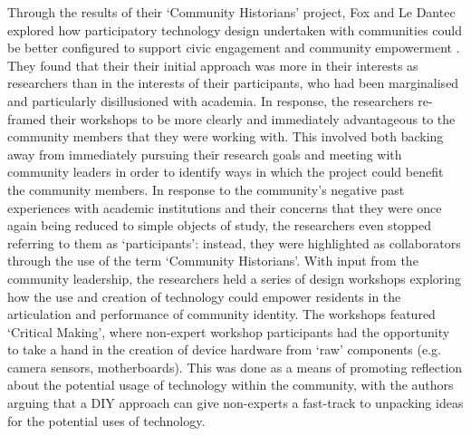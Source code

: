 Through the results of their `Community Historians' project, Fox and Le Dantec explored how participatory technology design undertaken with communities could be better configured to support civic engagement and community empowerment \citep{Fox2014}. They found that their their initial approach was more in their interests as researchers than in the interests of their participants, who had been marginalised and particularly disillusioned with academia. In response, the researchers re-framed their workshops to be more clearly and immediately advantageous to the community members that they were working with. This involved both backing away from immediately pursuing their research goals and meeting with community leaders in order to identify ways in which the project could benefit the community members. In response to the community's negative past experiences with academic institutions and their concerns that they were once again being reduced to simple objects of study, the researchers even stopped referring to them as `participants': instead, they were highlighted as collaborators through the use of the term `Community Historians'. With input from the community leadership, the researchers held a series of design workshops exploring how the use and creation of technology could empower residents in the articulation and performance of community identity. The workshops featured `Critical Making', where non-expert workshop participants had the opportunity to take a hand in the creation of device hardware from `raw' components (e.g. camera sensors, motherboards). This was done as a means of promoting reflection about the potential usage of technology within the community, with the authors arguing that a DIY approach can give non-experts a fast-track to unpacking ideas for the potential uses of technology. 

